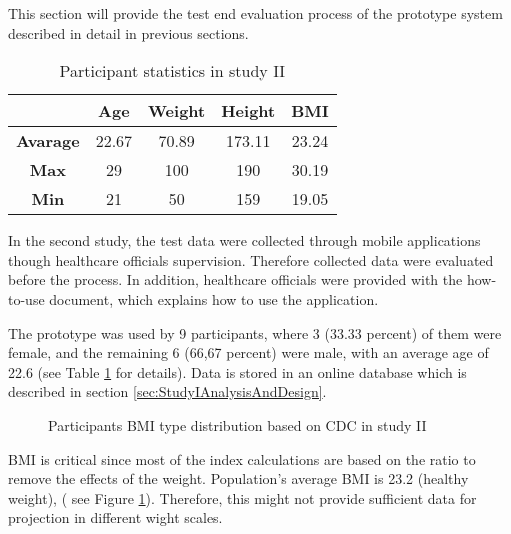 This section will provide the test end evaluation process of the prototype system described in detail in previous sections. 

\begin{table}[htbp]
\begin{center}
\caption{Participant statistics in study II}
\vspace{23pt}
      \begin{tabular}{|c|c|c|c|c|} \hline
          & \textbf{Age} & \textbf{Weight} & \textbf{Height} & \textbf{BMI} \\ \hline
        \textbf{Avarage} & 22.67 & 70.89 & 173.11 & 23.24 \\ \hline
        \textbf{Max} & 29 & 100 & 190 & 30.19 \\ \hline
        \textbf{Min} & 21 & 50 & 159 & 19.05 \\ \hline
    \end{tabular}
\label{tab:StudyIIParticipantStatistics}
\end{center}
\end{table}

In the second study, the test data were collected through mobile applications though healthcare officials supervision. Therefore collected data were evaluated before the process. In addition, healthcare officials were provided with the how-to-use document, which explains how to use the application. 

The prototype was used by 9 participants, where 3 (33.33 percent) of them were female, and the remaining 6 (66,67 percent) were male, with an average age of 22.6 (see Table \ref{tab:StudyIIParticipantStatistics} for details). Data is stored in an online database which is described in section \ref{sec:StudyIAnalysisAndDesign}. 

\begin{figure}[htbp]
\centering
{}
\caption{Participants BMI type distribution based on CDC in study II}
\label{fig:StudyIIParticipantsBMITypeDistribution}
\end{figure}

BMI is critical since most of the index calculations are based on the ratio to remove the effects of the weight. Population's average BMI is 23.2 (healthy weight), ( see Figure \ref{fig:StudyIIParticipantsBMITypeDistribution}). Therefore, this might not provide sufficient data for projection in different wight scales.

